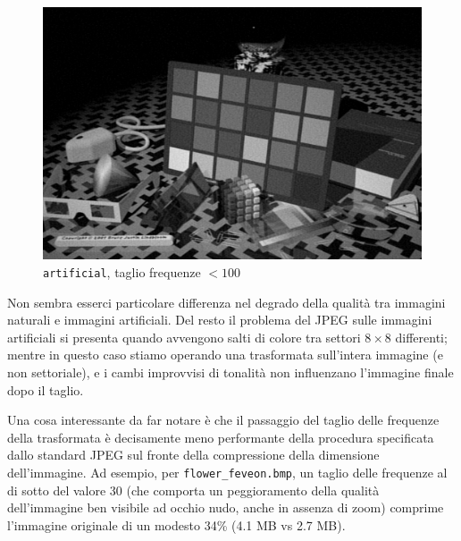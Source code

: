 \documentclass[11pt,a4paper]{scrartcl}
\begin{document}
\begin{figure}[!ht]
\centering
\includegraphics[scale=0.20]{images/artificialcut}
\caption{\texttt{artificial}, taglio frequenze $< 100$}
\end{figure}

\clearpage

Non sembra esserci particolare differenza nel degrado della qualità tra immagini naturali e immagini artificiali. Del resto il problema del JPEG sulle immagini artificiali si presenta quando avvengono salti di colore tra settori $8 \times 8$ differenti; mentre in questo caso stiamo operando una trasformata sull'intera immagine (e non settoriale), e i cambi improvvisi di tonalità non influenzano l'immagine finale dopo il taglio.

Una cosa interessante da far notare è che il passaggio del taglio delle frequenze della trasformata è decisamente meno performante della procedura specificata dallo standard JPEG sul fronte della compressione della dimensione dell'immagine. Ad esempio, per \texttt{flower\_feveon.bmp}, un taglio delle frequenze al di sotto del valore 30 (che comporta un peggioramento della qualità dell'immagine ben visibile ad occhio nudo, anche in assenza di zoom) comprime l'immagine originale di un modesto 34\% (4.1 MB vs 2.7 MB).
\end{document}
